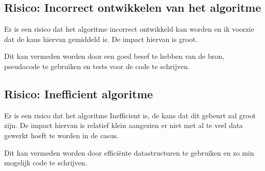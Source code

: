 \documentclass{article}
\begin{document}
\subsection{Risico: Incorrect ontwikkelen van het algoritme}

Er is een risico dat het algoritme incorrect ontwikkeld kan worden en ik voorzie
dat de kans hiervan gemiddeld is. De impact hiervan is groot.

Dit kan vermeden worden door een goed besef te hebben van de bron, pseudocode te
gebruiken en tests voor de code te schrijven.

\subsection{Risico: Inefficient algoritme}

Er is een risico dat het algoritme Inefficient is, de kans dat dit gebeurt zal
groot zijn. De impact hiervan is relatief klein aangezien er niet met al te veel
data gewerkt hoeft te worden in de casus.

Dit kan vermeden worden door efficiënte datastructuren te gebruiken en zo min
mogelijk code te schrijven.

\printbibliography

\listoffigures

\listoftables
\end{document}

